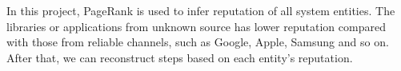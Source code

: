 In this project, PageRank\cite{pagerank} is used to infer reputation of all system entities. The libraries or applications from unknown source has lower reputation compared with those from reliable channels, such as Google, Apple, Samsung and so on. After that, we can reconstruct steps based on each entity's reputation.
